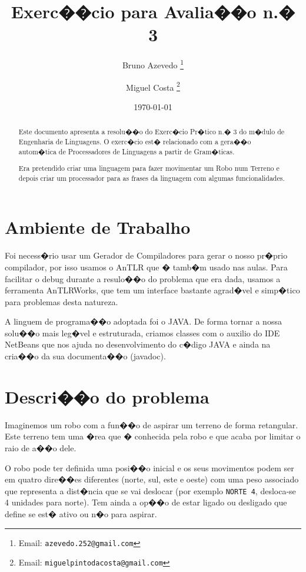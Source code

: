 \documentclass[a4paper]{article}
\title{Exerc��cio para Avalia��o n.� 3}
\author{Bruno Azevedo%
  \thanks{Email: \texttt{azevedo.252@gmail.com}}}
\author{Miguel Costa%
  \thanks{Email: \texttt{miguelpintodacosta@gmail.com}}}
\affil{M�dulo Engenharia Gramatical,\\ UCE30 Engenharia de Linguagens,
\\ Mestrado em Engenharia Inform�tical,\\Universidade do Minho}
\date{\today}
\begin{document}
\maketitle

\begin{abstract}
Este documento apresenta a resolu��o do Exerc�cio Pr�tico n.� 3 do m�dulo de Engenharia de Linguagens.
O exerc�cio est� relacionado com a gera��o autom�tica de Processadores de Linguagens a partir de Gram�ticas. 

Era pretendido criar uma linguagem para fazer movimentar um Robo num Terreno e depois criar um processador para as frases da linguagem com algumas funcionalidades.
\end{abstract}


\newpage

\parskip=0mm
\tableofcontents
\parskip=2mm

\newpage

\section{Ambiente de Trabalho}
Foi necess�rio usar um Gerador de Compiladores para gerar o nosso pr�prio compilador, por isso usamos o AnTLR que � tamb�m usado nas aulas. Para facilitar o debug durante a resulo��o do problema que era dada, usamos a ferramenta AnTLRWorks, que tem um interface bastante agrad�vel e simp�tico para problemas desta natureza.

A linguem de programa��o adoptada foi o JAVA. De forma tornar a nossa solu��o mais leg�vel e estruturada, criamos classes com o auxilio  do IDE NetBeans que nos ajuda no desenvolvimento do c�digo JAVA e ainda na cria��o da sua documenta��o (javadoc).


\section{Descri��o do problema}
Imaginemos um robo com a fun��o de aspirar um terreno de forma retangular. Este terreno tem uma �rea que � conhecida pela robo e que acaba por limitar o raio de a��o dele.

O robo pode ter definida uma posi��o inicial e os seus movimentos podem ser em quatro dire��es diferentes (norte, sul, este e oeste) com uma peso associado que representa a dist�ncia que se vai deslocar (por exemplo \verb|NORTE 4|, desloca-se 4 unidades para norte). Tem ainda a op��o de estar ligado ou desligado que define se est� ativo ou n�o para aspirar.
\end{document}
